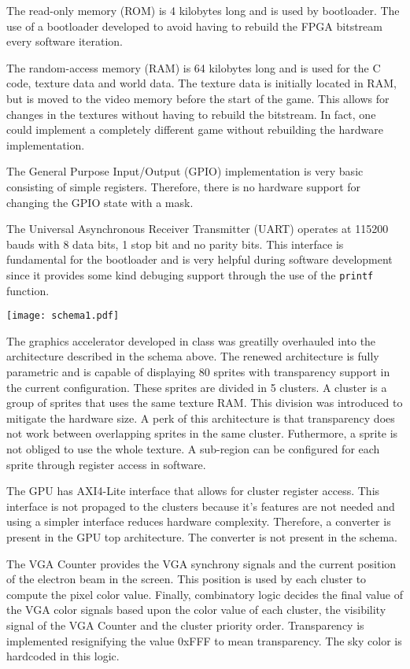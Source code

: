 \documentclass[12pt,a4paper]{article}
\begin{document}
The read-only memory (ROM) is 4 kilobytes long and is used by bootloader. The
use of a bootloader developed to avoid having to rebuild the FPGA bitstream 
every software iteration.

The random-access memory (RAM) is 64 kilobytes long and is used for the C code,
texture data and world data. The texture data is initially located in RAM, but
is moved to the video memory before the start of the game. This allows for 
changes in the textures without having to rebuild the bitstream. In fact, one
could implement a completely different game without rebuilding the hardware 
implementation.

The General Purpose Input/Output (GPIO) implementation is very basic consisting
of simple registers. Therefore, there is no hardware support for changing the 
GPIO state with a mask.

The Universal Asynchronous Receiver Transmitter (UART) operates at 115200 bauds
with 8 data bits, 1 stop bit and no parity bits. This interface is fundamental
for the bootloader and is very helpful during software development since it
provides some kind debuging support through the use of the \texttt{printf}
function.

\begin{center}
\texttt{[image: schema1.pdf]}
\label{fig:schema1}
\end{center} 

The graphics accelerator developed in class was greatilly overhauled into the
architecture described in the schema above. The renewed architecture is fully
parametric and is capable of displaying 80 sprites with transparency support 
in the current configuration. These sprites are divided in 5 clusters. 
A cluster is a group of sprites that uses the same texture RAM. This division
was introduced to mitigate the hardware size. A perk of this architecture is
that transparency does not work between overlapping sprites in the same cluster.
Futhermore, a sprite is not obliged to use the whole texture. A sub-region can
be configured for each sprite through register access in software.

The GPU has AXI4-Lite interface that allows for cluster register access. This
interface is not propaged to the clusters because it's features are not needed
and using a simpler interface reduces hardware complexity. Therefore, a 
converter is present in the GPU top architecture. The converter is not present
in the schema.

The VGA Counter provides the VGA synchrony signals and the current position of
the electron beam in the screen. This position is used by each cluster to
compute the pixel color value. Finally, combinatory logic decides the final
value of the VGA color signals based upon the color value of each cluster,
the visibility signal of the VGA Counter and the cluster priority order. 
Transparency is implemented resignifying the value 0xFFF to mean transparency.
The sky color is hardcoded in this logic.
\end{document}
